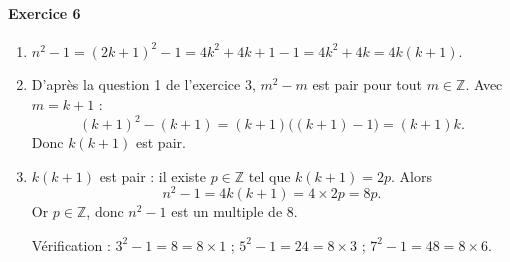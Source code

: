\documentclass[11pt,a4paper]{article}
\newcommand{\Z}{\mathbb{Z}}
\newcommand{\exo}[1]{\paragraph{Exercice #1}}
\newcommand{\rep}[1]{\textbf{#1}}
\begin{document}
\exo{6}
\begin{enumerate}[label=\rep{\arabic*.}]
  \item $n^2 - 1 = (2k+1)^2 - 1 = 4k^2 + 4k + 1 - 1 = 4k^2 + 4k = 4k(k+1)$.

  \item D'après la question 1 de l'exercice 3, $m^2 - m$ est pair pour tout $m \in \Z$. Avec $m = k + 1$ :
  \[ (k+1)^2 - (k+1) = (k+1)\big((k+1) - 1\big) = (k+1)k. \]
  Donc $k(k+1)$ est pair.

  \item $k(k+1)$ est pair : il existe $p \in \Z$ tel que $k(k+1) = 2p$. Alors
  \[ n^2 - 1 = 4k(k+1) = 4 \times 2p = 8p. \]
  Or $p \in \Z$, donc $n^2 - 1$ est un multiple de $8$.

  Vérification : $3^2 - 1 = 8 = 8 \times 1$ \quad ; \quad $5^2 - 1 = 24 = 8 \times 3$ \quad ; \quad $7^2 - 1 = 48 = 8 \times 6$.
\end{enumerate}
\end{document}
